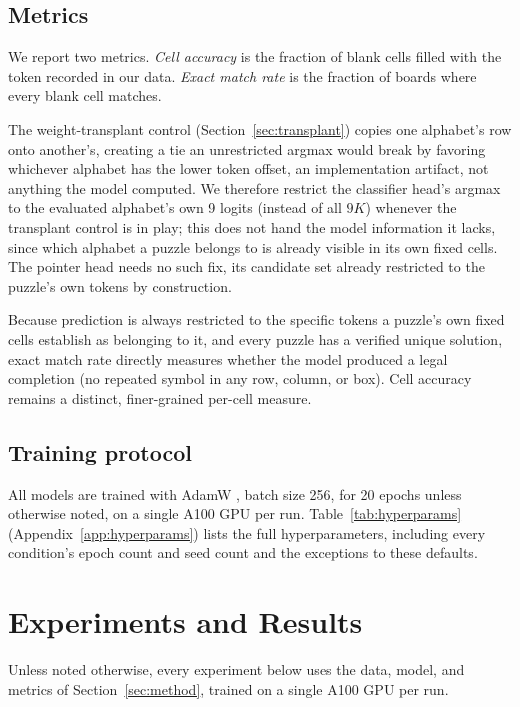 \documentclass{article} %
\begin{document}
\subsection{Metrics}

We report two metrics. \emph{Cell accuracy} is the
fraction of blank cells filled with the token recorded in our data.
\emph{Exact match rate} is the fraction of boards where every blank
cell matches.

The weight-transplant control (Section~\ref{sec:transplant}) copies one
alphabet's row onto another's, creating a tie an unrestricted argmax
would break by favoring whichever alphabet has the lower token offset,
an implementation artifact, not anything the model computed. We
therefore restrict the classifier head's argmax to the evaluated
alphabet's own 9 logits (instead of all $9K$) whenever the transplant
control is in play; this does not hand the model information it lacks,
since which alphabet a puzzle belongs to is already visible in its own
fixed cells. The pointer head needs no such fix, its candidate set
already restricted to the puzzle's own tokens by construction.

Because prediction is always restricted to the specific tokens a
puzzle's own fixed cells establish as belonging to it, and every puzzle
has a verified unique solution, exact match rate directly measures
whether the model produced a legal completion (no repeated symbol in any
row, column, or box). Cell accuracy remains a distinct, finer-grained
per-cell measure.

\subsection{Training protocol}

All models are trained with AdamW \citep{loshchilov2019decoupled}, batch
size 256, for 20 epochs unless otherwise noted, on a single A100 GPU per
run. Table~\ref{tab:hyperparams} (Appendix~\ref{app:hyperparams}) lists
the full hyperparameters, including every condition's epoch count and
seed count and the exceptions to these defaults.

\section{Experiments and Results}
\label{sec:results}

Unless noted otherwise, every experiment below uses the data, model, and
metrics of Section~\ref{sec:method}, trained on a single A100 GPU per
run.
\end{document}
